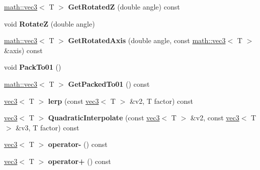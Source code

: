 \begin{DoxyCompactItemize}
\item 
\hypertarget{classmath_1_1vec3_acdf735154a892bc3483944ac8418b82a}{
\hyperlink{classmath_1_1vec3}{math::vec3}$<$ T $>$ {\bfseries GetRotatedZ} (double angle) const }
\label{classmath_1_1vec3_acdf735154a892bc3483944ac8418b82a}

\item 
\hypertarget{classmath_1_1vec3_aeebdb2765988f12467c2b5494595ccc5}{
void {\bfseries RotateZ} (double angle)}
\label{classmath_1_1vec3_aeebdb2765988f12467c2b5494595ccc5}

\item 
\hypertarget{classmath_1_1vec3_a1e32d34ba4af2ca4d3e93dd6089815a8}{
\hyperlink{classmath_1_1vec3}{math::vec3}$<$ T $>$ {\bfseries GetRotatedAxis} (double angle, const \hyperlink{classmath_1_1vec3}{math::vec3}$<$ T $>$ \&axis) const }
\label{classmath_1_1vec3_a1e32d34ba4af2ca4d3e93dd6089815a8}

\item 
\hypertarget{classmath_1_1vec3_a2834906e384cd12364a0cfc7aa633fd6}{
void {\bfseries PackTo01} ()}
\label{classmath_1_1vec3_a2834906e384cd12364a0cfc7aa633fd6}

\item 
\hypertarget{classmath_1_1vec3_a9e1747a7966f2673d07435825dfd7425}{
\hyperlink{classmath_1_1vec3}{math::vec3}$<$ T $>$ {\bfseries GetPackedTo01} () const }
\label{classmath_1_1vec3_a9e1747a7966f2673d07435825dfd7425}

\item 
\hypertarget{classmath_1_1vec3_ae60dea9bcf2b847d475ad640a7b8851b}{
\hyperlink{classmath_1_1vec3}{vec3}$<$ T $>$ {\bfseries lerp} (const \hyperlink{classmath_1_1vec3}{vec3}$<$ T $>$ \&v2, T factor) const }
\label{classmath_1_1vec3_ae60dea9bcf2b847d475ad640a7b8851b}

\item 
\hypertarget{classmath_1_1vec3_a105110ab02f529670bd32653f77e864a}{
\hyperlink{classmath_1_1vec3}{vec3}$<$ T $>$ {\bfseries QuadraticInterpolate} (const \hyperlink{classmath_1_1vec3}{vec3}$<$ T $>$ \&v2, const \hyperlink{classmath_1_1vec3}{vec3}$<$ T $>$ \&v3, T factor) const }
\label{classmath_1_1vec3_a105110ab02f529670bd32653f77e864a}

\item 
\hypertarget{classmath_1_1vec3_a9fff5b62a267357932db72711431aaec}{
\hyperlink{classmath_1_1vec3}{vec3}$<$ T $>$ {\bfseries operator-\/} () const }
\label{classmath_1_1vec3_a9fff5b62a267357932db72711431aaec}

\item 
\hypertarget{classmath_1_1vec3_a023dcce232314615765661050e4eb542}{
\hyperlink{classmath_1_1vec3}{vec3}$<$ T $>$ {\bfseries operator+} () const }
\label{classmath_1_1vec3_a023dcce232314615765661050e4eb542}


\end{DoxyCompactItemize}
